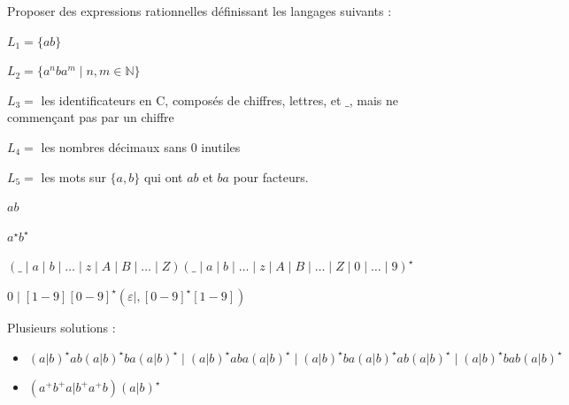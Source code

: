 
\begingroup

\begin{exercice} \label{exo:lexing/regexp/write_regexp}

  Proposer des expressions rationnelles définissant les langages suivants :
  \begin{questions}
  \item $L_1 = \{ab\}$
  \item $L_2 = \{a^nba^m \mid n, m \in \mathbb{N}\}$
  \item $L_3 = $ les identificateurs en C, composés de chiffres, lettres, et $\_$, mais ne commençant pas par un chiffre
  \item $L_4 = $ les nombres décimaux sans 0 inutiles
  \item $L_5 = $ les mots sur $\{a,b\}$ qui ont $ab$ et $ba$ pour facteurs.
  \end{questions}

\end{exercice}

\begin{corrections}

  \begin{questions}
  \item $ab$
  \item $a^\star b^\star$
  \item $(\_\mid a\mid b\mid  \ldots \mid z \mid A\mid B \mid  \ldots \mid Z)(\_\mid a\mid b\mid  \ldots \mid z \mid A\mid B \mid  \ldots \mid Z \mid 0\mid  \ldots \mid 9)^\star$
  \item $0 \mid [1-9][0-9]^\star (\varepsilon\mid ,[0-9]^\star[1-9])$
  \item Plusieurs solutions :
    \begin{itemize}
    \item $ (a|b)^\star ab (a|b)^\star ba (a|b)^\star \mid (a|b)^\star aba (a|b)^\star \mid (a|b)^\star ba (a|b)^\star ab (a|b)^\star \mid (a|b)^\star bab (a|b)^\star $
    \item $ (a^+ b^+ a | b^+ a^+ b) (a|b)^\star$
    \end{itemize}
  \end{questions}

\end{corrections}

\endgroup
\endinput
